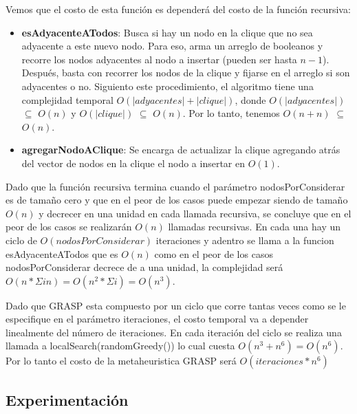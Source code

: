 Vemos que el costo de esta función es dependerá del costo de la función recursiva:

\begin{itemize}

    \item \textbf{esAdyacenteATodos}: Busca si hay un nodo en la clique que no sea adyacente a este nuevo nodo. Para eso, arma un arreglo de booleanos y recorre los nodos adyacentes al nodo a insertar (pueden ser hasta $n-1$). Después, basta con recorrer los nodos de la clique y fijarse en el arreglo si son adyacentes o no. Siguiento este procedimiento, el algoritmo tiene una complejidad temporal $O(|adyacentes| + |clique|)$, donde $O(|adyacentes|)$ $\subseteq$ $O(n)$ y $O(|clique|)$ $\subseteq$ $O(n)$. Por lo tanto, tenemos $O(n + n)$  $\subseteq$ $O(n)$.

    \item \textbf{agregarNodoAClique}: Se encarga de actualizar la clique agregando atrás del vector de nodos en la clique el nodo a insertar en $O(1)$.

\end{itemize}

Dado que la función recursiva termina cuando el parámetro nodosPorConsiderar es de tamaño cero y que en el peor de los casos puede empezar siendo de tamaño $O(n)$ y decrecer en una unidad en cada llamada recursiva, se concluye que en el peor de los casos se realizarán $O(n)$ llamadas recursivas. En cada una hay un ciclo de $O(nodosPorConsiderar)$ iteraciones y adentro se llama a la funcion esAdyacenteATodos que es $O(n)$ como en el peor de los casos nodosPorConsiderar decrece de a una unidad, la complejidad será $O(n * \Sigma in) = O(n^2 * \Sigma i) = O(n^3)$.

Dado que GRASP esta compuesto por un ciclo que corre tantas veces como se le especifique en el parámetro iteraciones, el costo temporal va a depender linealmente del número de iteraciones. En cada iteración del ciclo se realiza una llamada a localSearch(randomGreedy()) lo cual cuesta $O(n^3 + n^6) = O(n^6)$. Por lo tanto el costo de la metaheuristica GRASP será $O(iteraciones * n^6)$


\subsection{Experimentación}







